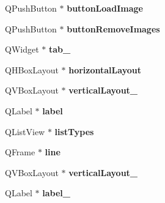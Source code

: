 \begin{DoxyCompactItemize}
\item 
Q\+Push\+Button $\ast$ {\bfseries button\+Load\+Image}\hypertarget{class_ui___main_form_a542860dfc6ab3d86d940e8a9b4ce0573}{}\label{class_ui___main_form_a542860dfc6ab3d86d940e8a9b4ce0573}

\item 
Q\+Push\+Button $\ast$ {\bfseries button\+Remove\+Images}\hypertarget{class_ui___main_form_a6b51e55c0158935c1ea0ca223a887772}{}\label{class_ui___main_form_a6b51e55c0158935c1ea0ca223a887772}

\item 
Q\+Widget $\ast$ {\bfseries tab\+\_}\hypertarget{class_ui___main_form_ac12d79b27be03656444bdb00dae7a62f}{}\label{class_ui___main_form_ac12d79b27be03656444bdb00dae7a62f}

\item 
Q\+H\+Box\+Layout $\ast$ {\bfseries horizontal\+Layout}\hypertarget{class_ui___main_form_a553a9967f6be6e9d1e0a0a54fee10daa}{}\label{class_ui___main_form_a553a9967f6be6e9d1e0a0a54fee10daa}

\item 
Q\+V\+Box\+Layout $\ast$ {\bfseries vertical\+Layout\+\_}\hypertarget{class_ui___main_form_af5f20de128fc30c9fd90d460a85afc59}{}\label{class_ui___main_form_af5f20de128fc30c9fd90d460a85afc59}

\item 
Q\+Label $\ast$ {\bfseries label}\hypertarget{class_ui___main_form_a1616edf4b999f5a98c11fd85377abb73}{}\label{class_ui___main_form_a1616edf4b999f5a98c11fd85377abb73}

\item 
Q\+List\+View $\ast$ {\bfseries list\+Types}\hypertarget{class_ui___main_form_a7a2da06a8eb9c958a6c9f954b33d66a7}{}\label{class_ui___main_form_a7a2da06a8eb9c958a6c9f954b33d66a7}

\item 
Q\+Frame $\ast$ {\bfseries line}\hypertarget{class_ui___main_form_afd49fd1bb8c7909456e134150972c9e7}{}\label{class_ui___main_form_afd49fd1bb8c7909456e134150972c9e7}

\item 
Q\+V\+Box\+Layout $\ast$ {\bfseries vertical\+Layout\+\_}\hypertarget{class_ui___main_form_a84103ec26d0f73ba90bafe93c92b362b}{}\label{class_ui___main_form_a84103ec26d0f73ba90bafe93c92b362b}

\item 
Q\+Label $\ast$ {\bfseries label\+\_}\hypertarget{class_ui___main_form_a8c88102e67d7d9d33264817df98c1b57}{}\label{class_ui___main_form_a8c88102e67d7d9d33264817df98c1b57}


\end{DoxyCompactItemize}
